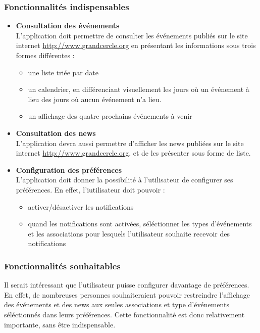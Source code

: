 \documentclass[a4paper, 11px]{article}
\begin{document}
\subsubsection{Fonctionnalités indispensables}
\begin{itemize}
	\item[\textbullet] \textbf{Consultation des événements}\\
	L'application doit permettre de consulter les événements publiés sur le site internet \underline{http://www.grandcercle.org} en présentant les informations sous trois formes différentes :
	\begin{itemize}
		\item une liste triée par date
		\item un calendrier, en différenciant visuellement les jours où un événement à lieu des jours où aucun événement n'a lieu.
		\item un affichage des quatre prochains événements à venir
	\\
	\end{itemize}

	\item[\textbullet] \textbf{Consultation des news}\\
	L'application devra aussi permettre d'afficher les news publiées sur le site internet \underline{http://www.grandcercle.org}, et de les présenter sous forme de liste.\\
	\item[\textbullet] \textbf{Configuration des préférences}\\
	L'application doit donner la possibilité à l'utilisateur de configurer ses préférences. En effet, l'iutilisateur doit pouvoir :
	\begin{itemize}
		\item activer/désactiver les notifications
		\item quand les notifications sont activées, séléctionner les types d'événements et les associations pour lesquels l'utilisateur souhaite recevoir des notifications
	\end{itemize}
\end{itemize}
\subsubsection{Fonctionnalités souhaitables}
Il serait intéressant que l'utilisateur puisse configurer davantage de préférences.\\
En effet, de nombreuses personnes souhaiteraient pouvoir restreindre l'affichage des événements et des news aux seules associations et type d'événements séléctionnés dans leurs préférences. Cette fonctionnalité est donc relativement importante, sans être indispensable.
\end{document}
